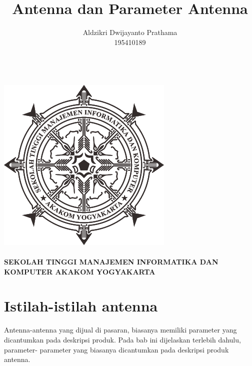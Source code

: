 \documentclass[a4paper,12pt]{article}
\begin{document}
\title{Antenna dan Parameter Antenna}
\author{Aldzikri Dwijayanto Prathama
	\\195410189}
\makeatletter
\begin{titlepage}
	\begin{center}
		{\huge \bfseries \@title }\\[14ex]
		\includegraphics[scale=.8]{logo}\\[4ex]
		{\large \@author}\\[20ex]
		{\large \bfseries {SEKOLAH TINGGI MANAJEMEN INFORMATIKA DAN KOMPUTER
				AKAKOM YOGYAKARTA}}
	\end{center}


\end{titlepage}
\makeatother
\renewcommand{\figurename}{Gambar}
\newpage
\section{Istilah-istilah antenna}
Antenna-antenna yang dijual di pasaran, biasanya memiliki parameter yang dicantumkan pada deskripsi produk. Pada bab ini dijelaskan terlebih dahulu, parameter-
parameter yang biasanya dicantumkan pada deskripsi produk antenna.
\end{document}
